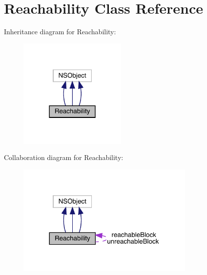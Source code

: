 \hypertarget{interface_reachability}{}\section{Reachability Class Reference}
\label{interface_reachability}


Inheritance diagram for Reachability\+:\nopagebreak
\begin{figure}[H]
\begin{center}
\leavevmode
\includegraphics[width=150pt]{interface_reachability__inherit__graph}
\end{center}
\end{figure}


Collaboration diagram for Reachability\+:\nopagebreak
\begin{figure}[H]
\begin{center}
\leavevmode
\includegraphics[width=248pt]{interface_reachability__coll__graph}
\end{center}
\end{figure}
